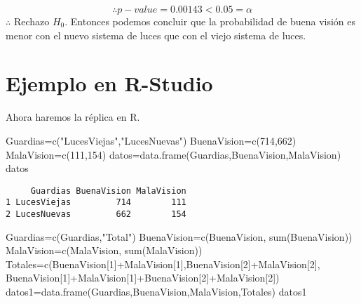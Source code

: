 \documentclass[
  a4paper,
  oneside,
  openany]{book}
\newenvironment{Shaded}{\begin{snugshade}}{\end{snugshade}}
\newcommand{\DecValTok}[1]{\textcolor[rgb]{0.00,0.00,0.81}{#1}}
\newcommand{\FunctionTok}[1]{\textcolor[rgb]{0.00,0.00,0.00}{#1}}
\newcommand{\NormalTok}[1]{#1}
\newcommand{\OtherTok}[1]{\textcolor[rgb]{0.56,0.35,0.01}{#1}}
\newcommand{\SpecialCharTok}[1]{\textcolor[rgb]{0.00,0.00,0.00}{#1}}
\newcommand{\StringTok}[1]{\textcolor[rgb]{0.31,0.60,0.02}{#1}}
\begin{document}
\[\therefore p-value=0.00143 < 0.05=\alpha\]
\(\therefore\) Rechazo \(H_0\). Entonces podemos concluir que la probabilidad de buena visión es menor con el nuevo sistema de luces que con el viejo sistema de luces.

\hypertarget{ejemplo-en-r-studio-9}{%
\section{Ejemplo en R-Studio}\label{ejemplo-en-r-studio-9}}

Ahora haremos la réplica en R.

\begin{Shaded}
\begin{Highlighting}[]
\NormalTok{Guardias}\OtherTok{=}\FunctionTok{c}\NormalTok{(}\StringTok{"LucesViejas"}\NormalTok{,}\StringTok{"LucesNuevas"}\NormalTok{)}
\NormalTok{BuenaVision}\OtherTok{=}\FunctionTok{c}\NormalTok{(}\DecValTok{714}\NormalTok{,}\DecValTok{662}\NormalTok{)}
\NormalTok{MalaVision}\OtherTok{=}\FunctionTok{c}\NormalTok{(}\DecValTok{111}\NormalTok{,}\DecValTok{154}\NormalTok{)}
\NormalTok{datos}\OtherTok{=}\FunctionTok{data.frame}\NormalTok{(Guardias,BuenaVision,MalaVision)}
\NormalTok{datos}
\end{Highlighting}
\end{Shaded}

\begin{verbatim}
     Guardias BuenaVision MalaVision
1 LucesViejas         714        111
2 LucesNuevas         662        154
\end{verbatim}

\begin{Shaded}
\begin{Highlighting}[]
\NormalTok{Guardias}\OtherTok{=}\FunctionTok{c}\NormalTok{(Guardias,}\StringTok{"Total"}\NormalTok{)}
\NormalTok{BuenaVision}\OtherTok{=}\FunctionTok{c}\NormalTok{(BuenaVision, }\FunctionTok{sum}\NormalTok{(BuenaVision))}
\NormalTok{MalaVision}\OtherTok{=}\FunctionTok{c}\NormalTok{(MalaVision, }\FunctionTok{sum}\NormalTok{(MalaVision))}
\NormalTok{Totales}\OtherTok{=}\FunctionTok{c}\NormalTok{(BuenaVision[}\DecValTok{1}\NormalTok{]}\SpecialCharTok{+}\NormalTok{MalaVision[}\DecValTok{1}\NormalTok{],BuenaVision[}\DecValTok{2}\NormalTok{]}\SpecialCharTok{+}\NormalTok{MalaVision[}\DecValTok{2}\NormalTok{],}
\NormalTok{           BuenaVision[}\DecValTok{1}\NormalTok{]}\SpecialCharTok{+}\NormalTok{MalaVision[}\DecValTok{1}\NormalTok{]}\SpecialCharTok{+}\NormalTok{BuenaVision[}\DecValTok{2}\NormalTok{]}\SpecialCharTok{+}\NormalTok{MalaVision[}\DecValTok{2}\NormalTok{])}
\NormalTok{datos1}\OtherTok{=}\FunctionTok{data.frame}\NormalTok{(Guardias,BuenaVision,MalaVision,Totales)}
\NormalTok{datos1}
\end{Highlighting}
\end{Shaded}
\end{document}
